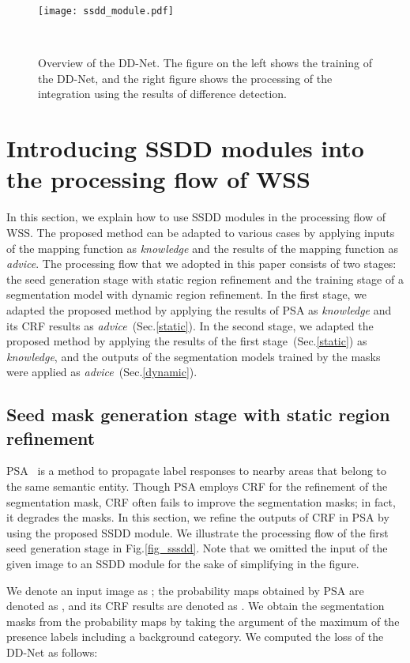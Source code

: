 \documentclass[10pt,twocolumn,letterpaper]{article}
\begin{document}
\begin{figure}[tb]
\begin{center}
\texttt{[image: ssdd\_module.pdf]}
\caption{Overview of the DD-Net. The figure on the left shows the training of the DD-Net, and the right figure shows the processing of the integration using the results of difference detection.} \label{fig_ssdd_module}
\vskip -5mm~
\end{center}
\end{figure}

\section{Introducing SSDD modules into the processing flow of WSS \label{application}}
In this section, we explain how to use SSDD modules in the processing flow of WSS.
The proposed method can be adapted to various cases by applying inputs of the mapping function as {\it knowledge} and the results of the mapping function as {\it advice}.
The processing flow that we adopted in this paper consists of two stages:
the seed generation stage with static region refinement and 
the training stage of a segmentation model with dynamic region refinement.
In the first stage, we adapted the proposed method by applying the results of PSA as {\it knowledge} and its CRF results as 
{\it advice}~(Sec.\ref{static}).
In the second stage, we adapted the proposed method by applying the results of the first stage~(Sec.\ref{static}) as {\it knowledge}, and the outputs of the segmentation models trained by the masks were applied as {\it advice}~(Sec.\ref{dynamic}).

\subsection{Seed mask generation stage with static region refinement\label{static}}
PSA~\cite{psa} is a method to propagate label responses 
to nearby areas that belong to the same semantic entity.
Though PSA employs CRF for the refinement of the segmentation mask, CRF often fails to improve the segmentation masks; in fact, it degrades the masks.
In this section, we refine the outputs of CRF in PSA by using the proposed SSDD module.
We illustrate the processing flow of the first seed generation stage in Fig.\ref{fig_sssdd}.
Note that we omitted the input of the given image to an SSDD module for the sake of simplifying in the figure.

We denote an input image as ; the probability maps obtained by PSA are denoted as 
, and its CRF results are denoted as .
We obtain the segmentation masks  from the probability maps  by taking the argument of the maximum of the presence labels including a background category.
We computed the loss of the DD-Net as follows:
\end{document}
